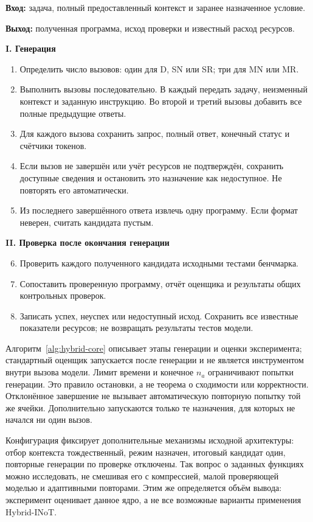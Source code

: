 \begin{algorithm}[htbp]
\caption{Генерация программы и проверка результата}
\label{alg:hybrid-core}
\small
\textbf{Вход:} задача, полный предоставленный контекст и заранее назначенное условие.\par
\textbf{Выход:} полученная программа, исход проверки и известный расход ресурсов.\par\medskip
\textbf{I. Генерация}
\begin{enumerate}\setlength{\itemsep}{2pt}\setlength{\parsep}{0pt}
\item Определить число вызовов: один для D, SN или SR; три для MN или MR.
\item Выполнить вызовы последовательно. В каждый передать задачу, неизменный контекст и заданную инструкцию. Во второй и третий вызовы добавить все полные предыдущие ответы.
\item Для каждого вызова сохранить запрос, полный ответ, конечный статус и счётчики токенов.
\item Если вызов не завершён или учёт ресурсов не подтверждён, сохранить доступные сведения и остановить это назначение как недоступное. Не повторять его автоматически.
\item Из последнего завершённого ответа извлечь одну программу. Если формат неверен, считать кандидата пустым.
\end{enumerate}
\textbf{II. Проверка после окончания генерации}
\begin{enumerate}\setcounter{enumi}{5}\setlength{\itemsep}{2pt}\setlength{\parsep}{0pt}
\item Проверить каждого полученного кандидата исходными тестами бенчмарка.
\item Сопоставить проверенную программу, отчёт оценщика и результаты общих контрольных проверок.
\item Записать успех, неуспех или недоступный исход. Сохранить все известные показатели ресурсов; не возвращать результаты тестов модели.
\end{enumerate}
\end{algorithm}

Алгоритм~\ref{alg:hybrid-core} описывает этапы генерации и оценки эксперимента; стандартный оценщик запускается после генерации и не является инструментом внутри вызова модели. Лимит времени и конечное $n_a$ ограничивают попытки генерации. Это правило остановки, а не теорема о сходимости или корректности. Отклонённое завершение не вызывает автоматическую повторную попытку той же ячейки. Дополнительно запускаются только те назначения, для которых не начался ни один вызов.

Конфигурация фиксирует дополнительные механизмы исходной архитектуры: отбор контекста тождественный, режим назначен, итоговый кандидат один, повторные генерации по проверке отключены. Так вопрос о заданных функциях можно исследовать, не смешивая его с компрессией, малой проверяющей моделью и адаптивными повторами. Этим же определяется объём вывода: эксперимент оценивает данное ядро, а не все возможные варианты применения Hybrid-INoT.
